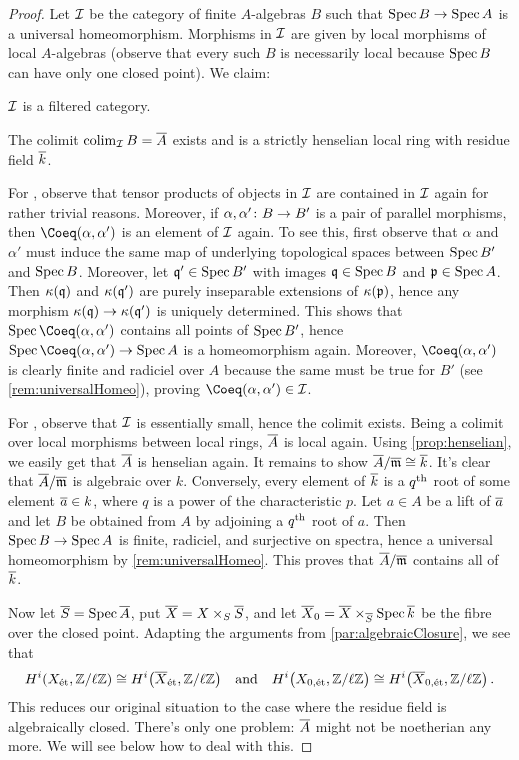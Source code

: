 \documentclass[a4paper, 10pt, oneside, DIV=9, chapterprefix=true, numbers=enddot, bibliography=totoc]{scrbook}
\begin{document}
\begin{proof}
	Let $\mathcal{I}$ be the category of finite $A$-algebras $B$ such that $\Spec B\morphism \Spec A$ is a universal homeomorphism. Morphisms in $\mathcal{I}$ are given by local morphisms of local $A$-algebras (observe that every such $B$ is necessarily local because $\operatorname{Spec} B$ can have only one closed point). We claim:
	\begin{numerate}
		\item $\mathcal{I}$ is a filtered category.
		\item The colimit $\colimit_\Ii B=\ov{A}$ exists and is a strictly henselian local ring with residue field $\ov{k}$.
	\end{numerate}
	For , observe that tensor products of objects in $\mathcal{I}$ are contained in $\mathcal{I}$ again for rather trivial reasons. Moreover, if $\alpha,\alpha'\colon B\morphism B'$ is a pair of parallel morphisms, then $\Coeq(\alpha,\alpha')$ is an element of $\mathcal{I}$ again. To see this, first observe that $\alpha$ and $\alpha'$ must induce the same map of underlying topological spaces between $\operatorname{Spec} B'$ and $\operatorname{Spec} B$. Moreover, let $\mathfrak{q}'\in \operatorname{Spec} B'$ with images $\mathfrak{q}\in \operatorname{Spec} B$ and $\mathfrak{p}\in \operatorname{Spec} A$. Then $\kappa(\mathfrak{q})$ and $\kappa(\mathfrak{q}')$ are purely inseparable extensions of $\kappa(\mathfrak{p})$, hence any morphism $\kappa(\qq)\morphism \kappa(\qq')$ is uniquely determined. This shows that $\Spec \Coeq(\alpha,\alpha')$ contains all points of $\operatorname{Spec} B'$, hence $\Spec \Coeq(\alpha,\alpha')\morphism \Spec A$ is a homeomorphism again. Moreover, $\Coeq(\alpha,\alpha')$ is clearly finite and radiciel over $A$ because the same must be true for $B'$ (see \cref{rem:universalHomeo}), proving $\Coeq(\alpha,\alpha')\in\Ii$.
	
	For , observe that $\mathcal{I}$ is essentially small, hence the colimit exists. Being a colimit over local morphisms between local rings, $\ov{A}$ is local again. Using \cref{prop:henselian}, we easily get that $\ov{A}$ is henselian again. It remains to show $\ov{A}/\ov{\mm}\cong \ov{k}$. It's clear that $\ov{A}/\ov{\mm}$ is algebraic over $k$. Conversely, every element of $\ov{k}$ is a $q^{\text{th}}$ root of some element $\ov{a}\in k$, where $q$ is a power of the characteristic $p$. Let $a\in A$ be a lift of $\ov{a}$ and let $B$ be obtained from $A$ by adjoining a $q^{\text{th}}$ root of $a$. Then $\Spec B\morphism \Spec A$ is finite, radiciel, and surjective on spectra, hence a universal homeomorphism by \cref{rem:universalHomeo}. This proves that $\ov{A}/\ov{\mm}$ contains all of $\ov{k}$.
	
	Now let $\ov{S}=\Spec \ov{A}$, put $\ov{X}=X\times_S\ov{S}$, and let $\ov{X}_0=\ov{X}\times_{\ov{S}}\Spec \ov{k}$ be the fibre over the closed point. Adapting the arguments from \cref{par:algebraicClosure}, we see that
	\begin{equation*}
		H^i(X_\et,\IZ/\ell\IZ)\cong H^i\big(\ov{X}_\et,\IZ/\ell\IZ\big)\quad\text{and}\quad H^i\big(X_{0,\et},\IZ/\ell\IZ\big)\cong H^i\big(\ov{X}_{0,\et},\IZ/\ell\IZ\big)\,.
	\end{equation*}
	 This reduces our original situation to the case where the residue field is algebraically closed. There's only one problem: $\ov{A}$ might not be noetherian any more. We will see below how to deal with this.
	 

\end{proof}
\end{document}
